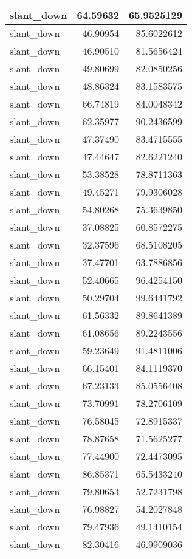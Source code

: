 \documentclass[
]{book}
\theoremstyle{definition}
\theoremstyle{definition}
\theoremstyle{definition}
\theoremstyle{definition}
\theoremstyle{remark}
\begin{document}
\begin{tabular}{l|r|r}
\hline
slant\_down & 64.59632 & 65.9525129\\
\hline
slant\_down & 46.90954 & 85.6022612\\
\hline
slant\_down & 46.90510 & 81.5656424\\
\hline
slant\_down & 49.80699 & 82.0850256\\
\hline
slant\_down & 48.86324 & 83.1583575\\
\hline
slant\_down & 66.74819 & 84.0048342\\
\hline
slant\_down & 62.35977 & 90.2436599\\
\hline
slant\_down & 47.37490 & 83.4715555\\
\hline
slant\_down & 47.44647 & 82.6221240\\
\hline
slant\_down & 53.38528 & 78.8711363\\
\hline
slant\_down & 49.45271 & 79.9306028\\
\hline
slant\_down & 54.80268 & 75.3639850\\
\hline
slant\_down & 37.08825 & 60.8572275\\
\hline
slant\_down & 32.37596 & 68.5108205\\
\hline
slant\_down & 37.47701 & 63.7886856\\
\hline
slant\_down & 52.40665 & 96.4254150\\
\hline
slant\_down & 50.29704 & 99.6441792\\
\hline
slant\_down & 61.56332 & 89.8641389\\
\hline
slant\_down & 61.08656 & 89.2243556\\
\hline
slant\_down & 59.23649 & 91.4811006\\
\hline
slant\_down & 66.15401 & 84.1119370\\
\hline
slant\_down & 67.23133 & 85.0556408\\
\hline
slant\_down & 73.70991 & 78.2706109\\
\hline
slant\_down & 76.58045 & 72.8915337\\
\hline
slant\_down & 78.87658 & 71.5625277\\
\hline
slant\_down & 77.44900 & 72.4473095\\
\hline
slant\_down & 86.85371 & 65.5433240\\
\hline
slant\_down & 79.80653 & 52.7231798\\
\hline
slant\_down & 76.98827 & 54.2027848\\
\hline
slant\_down & 79.47936 & 49.1410154\\
\hline
slant\_down & 82.30416 & 46.9909036\\

\end{tabular}
\end{document}
